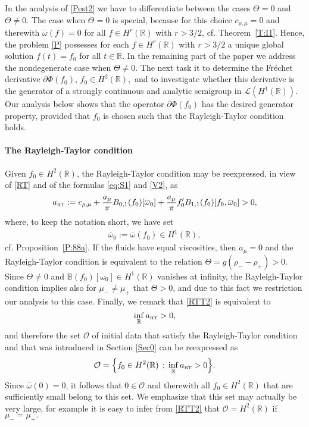 \documentclass[11pt,reqno]{amsart}
\numberwithin{equation}{section}
\newcommand{\0}{\Omega}
\newcommand{\p}{\partial}
\newcommand{\ov}{\overline}
\newcommand{\oo}{\ov\omega}
\newcommand{\bB}{\mathbb{B}}
\newcommand{\cO}{\mathcal{O}}
\newcommand{\kL}{\mathcal{L}}
\newcommand{\R}{\mathbb{R}}
\numberwithin{equation}{section}
\begin{document}
In the analysis of \eqref{Pest2} we have to differentiate between the cases  $\Theta=0$ and $\Theta\neq 0$.
The case when  $\Theta=0$ is special, because  for this choice  $c_{\rho,\mu}=0$ and  therewith $\oo(f)=0$ for all $f\in H^r(\R)$ with $r>3/2$, cf. Theorem~\ref{T:I1}.
Hence,  the problem \eqref{P} possesses for each $f\in H^r(\R)$ with $r>3/2$ a unique global solution $f(t)=f_0$ for all $t\in\R$.
In the remaining part of the paper we  address the nondegenerate case when 
$\Theta\neq0$.
The next task it to determine the Fr\'echet derivative $\p\Phi(f_0)$,   $f_0\in H^2(\R),$   and to investigate whether  this derivative is the generator of a strongly continuous and analytic semigroup in $\kL(H^1(\R))$.
Our analysis below shows that   the operator $\p\Phi(f_0)$ has the desired generator property, provided that   $f_0$ is chosen such that the Rayleigh-Taylor condition holds.\medskip


\paragraph{\bf The Rayleigh-Taylor condition} 
Given $f_0\in H^2(\R)$,  the  Rayleigh-Taylor condition may be reexpressed, in view of \eqref{RT} and of the formulas \eqref{eq:S1} and \eqref{V2}, as
  \begin{equation}\label{RTT2}
   a_{\text{\tiny RT}}:=c_{\rho,\mu} +\frac{a_\mu}{\pi }B_{0,1}(f_0)[\oo_0] +\frac{a_\mu}{\pi }f_0'B_{1,1}(f_0)[f_0,\oo_0]>0 ,
  \end{equation}
where, to keep the notation short, we have set
\begin{align}\label{000} 
 \oo_0:=\oo(f_0)\in H^1(\R),
\end{align}
 cf. Proposition~\ref{P:88a}. If the fluids have equal viscosities, then $a_\mu=0$ and the Rayleigh-Taylor condition is equivalent to the relation $\Theta=g(\rho_--\rho_+)>0.$ 
Since $\Theta\neq0$ and  $\bB(f_0)[\oo_0]\in H^1(\R)$ vanishes at infinity,    the Rayleigh-Taylor condition  implies also for $\mu_-\neq\mu_+$ that    $\Theta>0$, and  due to this fact we restriction 
our analysis to this case. 
Finally, we remark that  \eqref{RTT2} is equivalent to
\begin{equation}\label{RTT3}
  \inf_\R a_{\text{\tiny RT}}>0,
  \end{equation}
  and therefore the set $\cO$ of  initial data that satisfy the Rayleigh-Taylor condition and that was  introduced in Section \ref{Sec0} can be reexpressed as
\[
 \cO=\Big\{f_0\in H^2(\R)\,:\,\inf_\R a_{\text{\tiny RT}}>0 \Big\}.
 \]
 Since $\oo(0)=0$, it follows that $ 0\in\cO$ and therewith all $f_0\in H^2(\R)$ that are sufficiently small belong to this set. 
We emphasize that this set may  actually be very large, for example it is easy to infer from \eqref{RTT2} that $\cO=H^2(\R)$ if $\mu_-=\mu_+.$
\medskip
\end{document}
